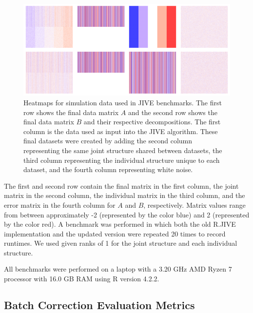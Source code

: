 \documentclass[unnumsec,webpdf,contemporary,large]{oup-authoring-template}%
\theoremstyle{thmstyleone}%
\theoremstyle{thmstyletwo}%
\theoremstyle{thmstylethree}%
\begin{document}
\begin{figure}[ht]
        \centering 
        \includegraphics[width=1\columnwidth]{simdata2_orig} 
        \caption[Simulation Data for JIVE Benchmarks]{Heatmaps for simulation data used in JIVE benchmarks. The first row shows the final data matrix $A$ and the second row shows the final data matrix $B$ and their respective decompositions. The first column is the data used as input into the JIVE algorithm. These final datasets were created by adding the second column representing the same joint structure shared between datasets, the third column representing the individual structure unique to each dataset, and the fourth column representing white noise.}
        \label{fig:simdata2_orig} 
\end{figure}

The first and second row contain the final matrix in the first column, the joint matrix in the second column, the individual matrix in the third column, and the error matrix in the fourth column for $A$ and $B$, respectively. Matrix values range from between approximately -2 (represented by the color blue) and 2 (represented by the color red). A benchmark was performed in which both the old R.JIVE implementation and the updated version were repeated 20 times to record runtimes. We used given ranks of 1 for the joint structure and each individual structure.

All benchmarks were performed on a laptop with a 3.20 GHz AMD Ryzen 7 processor with 16.0 GB RAM using R version 4.2.2.

\subsection{Batch Correction Evaluation Metrics}
\end{document}
